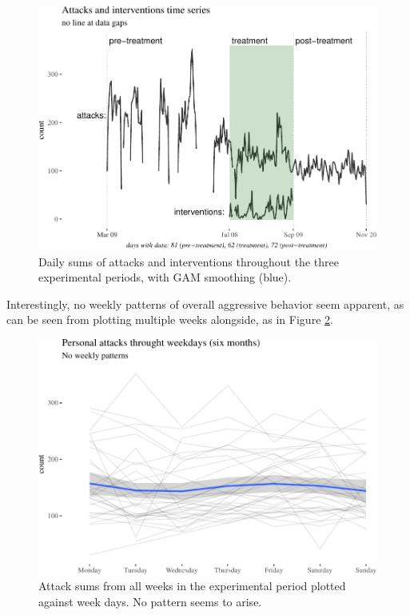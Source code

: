 \documentclass[
  10pt,
  dvipsnames, enabledeprecatedfontcommands]{scrartcl}
\begin{document}
\begin{figure}[H]

\begin{center}\includegraphics[width=1\linewidth]{technicalReport4_files/figure-latex/periodsPlot-1} \end{center}
\caption{Daily sums of attacks and interventions throughout the three experimental periods, with GAM smoothing (blue).}
\label{fig:periodsPlot}
\end{figure}

Interestingly, no weekly patterns of overall aggressive behavior seem
apparent, as can be seen from plotting multiple weeks alongside, as in
Figure \ref{fig:weeksPlot}.

\begin{figure}[H]

\begin{center}\includegraphics[width=1\linewidth]{technicalReport4_files/figure-latex/weeksPlot-1} \end{center}
\caption{Attack sums from all  weeks in the experimental period plotted against week days. No pattern seems to arise.}
\label{fig:weeksPlot}
\end{figure}
\end{document}

